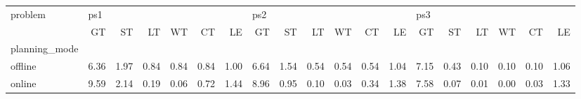 \begin{tabular}{lrrrrrrrrrrrrrrrrrr}
\toprule
problem & \multicolumn{6}{l}{ps1} & \multicolumn{6}{l}{ps2} & \multicolumn{6}{l}{ps3} \\
{} &   GT &   ST &   LT &   WT &   CT &   LE &   GT &   ST &   LT &   WT &   CT &   LE &   GT &   ST &   LT &   WT &   CT &   LE \\
planning\_mode &      &      &      &      &      &      &      &      &      &      &      &      &      &      &      &      &      &      \\
\midrule
offline       & 6.36 & 1.97 & 0.84 & 0.84 & 0.84 & 1.00 & 6.64 & 1.54 & 0.54 & 0.54 & 0.54 & 1.04 & 7.15 & 0.43 & 0.10 & 0.10 & 0.10 & 1.06 \\
online        & 9.59 & 2.14 & 0.19 & 0.06 & 0.72 & 1.44 & 8.96 & 0.95 & 0.10 & 0.03 & 0.34 & 1.38 & 7.58 & 0.07 & 0.01 & 0.00 & 0.03 & 1.33 \\
\bottomrule
\end{tabular}
